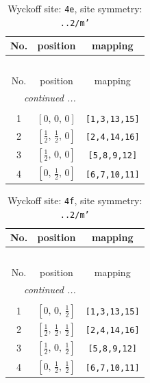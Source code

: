 \documentclass[fleqn,8pt]{jsarticle}
\begin{document}
\begin{longtable}{ccc}
\caption{Wyckoff site: {\tt 4e}, site symmetry: {\tt ..2/m'}}
 \\
 \hline \hline
No. & position & mapping \\ \hline \endfirsthead

\multicolumn{2}{l}{\tablename\ \thetable{}} \\
 \hline \hline
No. & position & mapping \\ \hline \endhead

 \hline \hline
\multicolumn{2}{r}{\footnotesize\it continued ...} \\ \endfoot

 \hline \hline
\multicolumn{2}{r}{} \\ \endlastfoot

1 & $\left[ 0,\, 0,\, 0 \right]$ & {\tt [1,3,13,15]} \\ \hline
2 & $\left[ \frac{1}{2},\, \frac{1}{2},\, 0 \right]$ & {\tt [2,4,14,16]} \\ \hline
3 & $\left[ \frac{1}{2},\, 0,\, 0 \right]$ & {\tt [5,8,9,12]} \\ \hline
4 & $\left[ 0,\, \frac{1}{2},\, 0 \right]$ & {\tt [6,7,10,11]} \\
\end{longtable}
\renewcommand{\arraystretch}{1.2}
\begin{longtable}{ccc}
\caption{Wyckoff site: {\tt 4f}, site symmetry: {\tt ..2/m'}}
 \\
 \hline \hline
No. & position & mapping \\ \hline \endfirsthead

\multicolumn{2}{l}{\tablename\ \thetable{}} \\
 \hline \hline
No. & position & mapping \\ \hline \endhead

 \hline \hline
\multicolumn{2}{r}{\footnotesize\it continued ...} \\ \endfoot

 \hline \hline
\multicolumn{2}{r}{} \\ \endlastfoot

1 & $\left[ 0,\, 0,\, \frac{1}{2} \right]$ & {\tt [1,3,13,15]} \\ \hline
2 & $\left[ \frac{1}{2},\, \frac{1}{2},\, \frac{1}{2} \right]$ & {\tt [2,4,14,16]} \\ \hline
3 & $\left[ \frac{1}{2},\, 0,\, \frac{1}{2} \right]$ & {\tt [5,8,9,12]} \\ \hline
4 & $\left[ 0,\, \frac{1}{2},\, \frac{1}{2} \right]$ & {\tt [6,7,10,11]} \\
\end{longtable}
\end{document}

